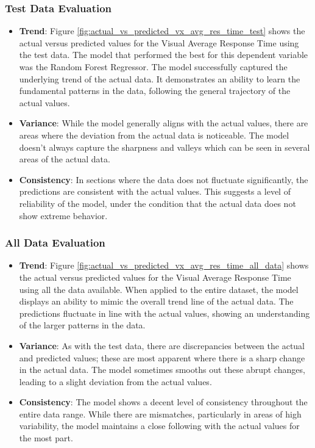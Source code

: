\subsubsection*{Test Data Evaluation}

\begin{itemize}
    \item \textbf{Trend}: Figure \ref{fig:actual_vs_predicted_vx_avg_res_time_test} shows the actual versus predicted values for the Visual Average Response Time using the test data.
        The model that performed the best for this dependent variable was the Random Forest Regressor. The model successfully captured the underlying trend of the actual data. 
        It demonstrates an ability to learn the fundamental patterns in the data, following the general trajectory of the actual values.
    \item \textbf{Variance}: While the model generally aligns with the actual values, there are areas where the deviation from the actual data is noticeable. The model doesn't
          always capture the sharpness and valleys which can be seen in several areas of the actual data.
    \item \textbf{Consistency}: In sections where the data does not fluctuate significantly, the predictions are consistent with the actual values. This suggests a level
          of reliability of the model, under the condition that the actual data does not show extreme behavior. 
\end{itemize}

\subsubsection*{All Data Evaluation}

\begin{itemize}
    \item \textbf{Trend}: Figure \ref{fig:actual_vs_predicted_vx_avg_res_time_all_data} shows the actual versus predicted values for the Visual Average Response Time using all the data available.
          When applied to the entire dataset, the model displays an ability to mimic the overall trend line of the actual data. The predictions fluctuate in line with the actual values,
          showing an understanding of the larger patterns in the data.
    \item \textbf{Variance}: As with the test data, there are discrepancies between the actual and predicted values; these are most apparent where there is a sharp change in the actual data.
          The model sometimes smooths out these abrupt changes, leading to a slight deviation from the actual values.
    \item \textbf{Consistency}: The model shows a decent level of consistency throughout the entire data range. While there are mismatches, particularly in areas of high variability,
          the model maintains a close following with the actual values for the most part.
\end{itemize}

